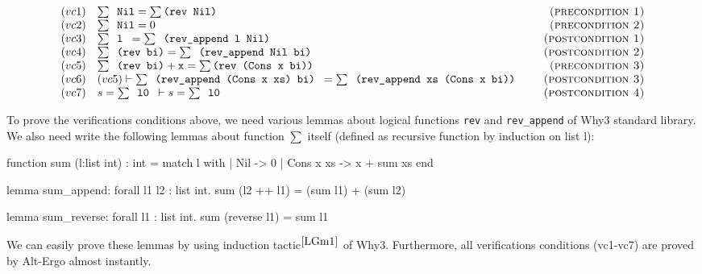 \documentclass[a4paper,11pt,oneside]{article}
\theoremstyle{plain}
\begin{document}
\begin{footnotesize}
\begin{displaymath}
\begin{array}{ll@{\hspace*{2em}}r}
(vc1)
	& \sum \texttt{ Nil} = \sum \texttt{(rev Nil)}  
	& \textsc{(precondition 1)}\\

(vc2)
	& \sum \texttt{ Nil} = 0 
	& \textsc{(precondition 2)}\\

(vc3)
  & \sum \texttt{ l } = \sum \texttt{ (rev\_append l Nil) }
 	& \textsc{(postcondition 1)}\\

(vc4)
  & \sum \texttt{ (rev bi)} = \sum \texttt{ (rev\_append Nil bi)}
 	& \textsc{(postcondition 2)}\\

(vc5)
	& \sum \texttt{ (rev bi)} + \texttt{x} = \sum \texttt{(rev (Cons x bi))}  
	& \textsc{(precondition 3)}\\

(vc6)
  & (vc5)
  	\vdash
  	\sum \texttt{ (rev\_append (Cons x xs) bi) } =
  	\sum \texttt{ (rev\_append xs (Cons x bi)) } 
    
 	& \textsc{(postcondition 3)}\\
	
(vc7)
  & s = \sum \texttt{ l0 } \vdash s = \sum \texttt{ l0 }
 	& \textsc{(postcondition 4)}\\	
\end{array}
\end{displaymath}
\end{footnotesize}

To prove the verifications conditions above, we need various lemmas about logical functions \texttt{rev} and \texttt{rev\_append} of Why3 standard library. We also need write the following lemmas about function $\sum$ itself (defined as recursive function by induction on list l):   
\begin{small}
\begin{whycode}
 function sum (l:list int) : int =
     match l with
       | Nil -> 0
       | Cons x xs -> x + sum xs end

 lemma sum_append:  forall l1 l2 : list int. sum (l2 ++ l1) = (sum l1) + (sum l2)

 lemma sum_reverse: forall l1 : list int. sum (reverse l1) = sum l1
\end{whycode}
\end{small}
We can easily prove these lemmas by using induction tactic{\footnotesize$^{ \cite{LGm1}}$} of Why3. Furthermore, all verifications conditions (vc1-vc7) are proved by Alt-Ergo almost instantly.
\end{document}
